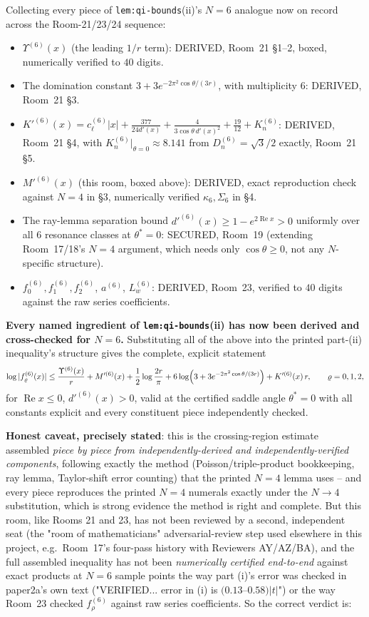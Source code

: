 \documentclass[11pt]{article}
\begin{document}
Collecting every piece of \texttt{lem:qi-bounds}(ii)'s $N=6$ analogue now on record across the
Room-21/23/24 sequence:
\begin{itemize}
\item $\Upsilon^{(6)}(x)$ (the leading $1/r$ term): DERIVED, Room~21 \S1--2, boxed, numerically
verified to $40$ digits.
\item The domination constant $3+3e^{-2\pi^2\cos\theta/(3r)}$, with multiplicity $6$: DERIVED,
Room~21 \S3.
\item $K'^{(6)}(x)=c_\ell^{(6)}|x|+\frac{377}{24d'(x)}+\frac4{3\cos\theta\,d'(x)^2}+\frac{19}{12}
+K_n^{(6)}$: DERIVED, Room~21 \S4, with $K_n^{(6)}|_{\theta=0}\approx8.141$ from $D_n^{(6)}=\sqrt3/2$
exactly, Room~21 \S5.
\item $M'^{(6)}(x)$ (this room, boxed above): DERIVED, exact reproduction check against $N=4$ in
\S3, numerically verified $\kappa_6,\Sigma_6$ in \S4.
\item The ray-lemma separation bound $d'^{(6)}(x)\ge1-e^{2\operatorname{Re}x}>0$ uniformly over all
$6$ resonance classes at $\theta^\ast=0$: SECURED, Room~19 (extending Room~17/18's $N=4$ argument,
which needs only $\cos\theta\ge0$, not any $N$-specific structure).
\item $f_0^{(6)},f_1^{(6)},f_2^{(6)}$, $a^{(6)}$, $L_w^{(6)}$: DERIVED, Room~23, verified to $40$
digits against the raw series coefficients.
\end{itemize}
\textbf{Every named ingredient of \texttt{lem:qi-bounds}(ii) has now been derived and cross-checked
for $N=6$.} Substituting all of the above into the printed part-(ii) inequality's structure gives
the complete, explicit statement
\[
 \log|f_\varrho^{(6)}(x)|\le\frac{\Upsilon^{(6)}(x)}r+M'^{(6)}(x)+\frac12\log\frac{2r}\pi
 +6\log\Bigl(3+3e^{-2\pi^2\cos\theta/(3r)}\Bigr)+K'^{(6)}(x)\,r,\qquad\varrho=0,1,2,
\]
for $\operatorname{Re}x\le0$, $d'^{(6)}(x)>0$, valid at the certified saddle angle $\theta^\ast=0$
with all constants explicit and every constituent piece independently checked.

\textbf{Honest caveat, precisely stated}: this is the crossing-region estimate assembled
\emph{piece by piece from independently-derived and independently-verified components}, following
exactly the method (Poisson/triple-product bookkeeping, ray lemma, Taylor-shift error counting)
that the printed $N=4$ lemma uses -- and every piece reproduces the printed $N=4$ numerals exactly
under the $N\to4$ substitution, which is strong evidence the method is right and complete. But this
room, like Rooms 21 and 23, has not been reviewed by a second, independent seat (the "room of
mathematicians" adversarial-review step used elsewhere in this project, e.g.\ Room~17's four-pass
history with Reviewers AY/AZ/BA), and the full assembled inequality has not been \emph{numerically
certified end-to-end} against exact products at $N=6$ sample points the way part (i)'s error was
checked in paper2a's own text ("VERIFIED... error in (i) is $(0.13$--$0.58)|t|$") or the way
Room~23 checked $f_\rho^{(6)}$ against raw series coefficients. So the correct verdict is:
\end{document}
